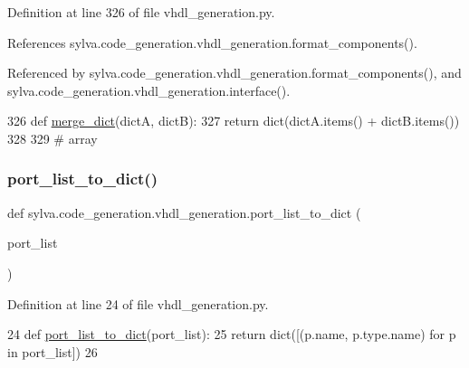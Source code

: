 Definition at line 326 of file vhdl\+\_\+generation.\+py.



References sylva.\+code\+\_\+generation.\+vhdl\+\_\+generation.\+format\+\_\+components().



Referenced by sylva.\+code\+\_\+generation.\+vhdl\+\_\+generation.\+format\+\_\+components(), and sylva.\+code\+\_\+generation.\+vhdl\+\_\+generation.\+interface().


\begin{DoxyCode}
326 \textcolor{keyword}{def }\hyperlink{namespacesylva_1_1code__generation_1_1vhdl__generation_a6f105e19192ce75934f22be90308ceff}{merge\_dict}(dictA, dictB):
327     \textcolor{keywordflow}{return} dict(dictA.items() + dictB.items())
328 
329 \textcolor{comment}{# array}
\end{DoxyCode}
\mbox{\label{namespacesylva_1_1code__generation_1_1vhdl__generation_a51a60df4116e05e838a7d6c61f434df5}} 
\subsubsection{\texorpdfstring{port\+\_\+list\+\_\+to\+\_\+dict()}{port\_list\_to\_dict()}}
{\footnotesize\ttfamily def sylva.\+code\+\_\+generation.\+vhdl\+\_\+generation.\+port\+\_\+list\+\_\+to\+\_\+dict (\begin{DoxyParamCaption}\item[{}]{port\+\_\+list }\end{DoxyParamCaption})}



Definition at line 24 of file vhdl\+\_\+generation.\+py.


\begin{DoxyCode}
24 \textcolor{keyword}{def }\hyperlink{namespacesylva_1_1code__generation_1_1vhdl__generation_a51a60df4116e05e838a7d6c61f434df5}{port\_list\_to\_dict}(port\_list):
25     \textcolor{keywordflow}{return} dict([(p.name, p.type.name) \textcolor{keywordflow}{for} p \textcolor{keywordflow}{in} port\_list])
26 
\end{DoxyCode}
\mbox{\label{namespacesylva_1_1code__generation_1_1vhdl__generation_ae2d3d4cc47d3292a63a983c9645c3010}} 
